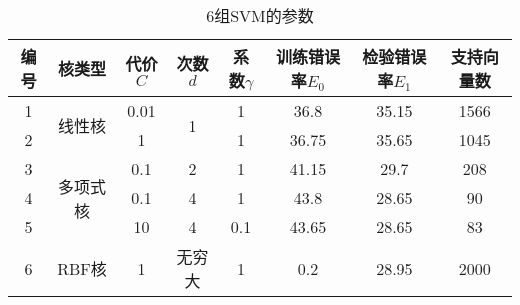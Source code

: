 {\small 
\begin{table}[htbp]
  \centering
  \caption{6组SVM的参数}
    \begin{tabular}{cccccccc}
    \hline
    {编号} & {核类型} & {代价$C$} & {次数$d$} & {系数$\gamma$} & {训练错误率$E_0$} & {检验错误率$E_1$} & {支持向量数} \\
    \hline
    1     & \multirow{2}[1]{*}{线性核} & 0.01  & \multirow{2}[1]{*}{1} & 1     & 36.8  & 35.15 & 1566 \\
    2     &       & 1     &       & 1     & 36.75 & 35.65 & 1045 \\
    3     & \multirow{3}[0]{*}{多项式核} & 0.1   & 2     & 1     & 41.15 & 29.7  & 208 \\
    4     &       & 0.1   & 4     & 1     & 43.8  & 28.65 & 90 \\
    5     &       & 10    & 4     & 0.1   & 43.65 & 28.65 & 83 \\
    6     & RBF核  & 1     & 无穷大   & 1     & 0.2   & 28.95 & 2000 \\
   \hline
    \end{tabular}%
  \label{tab:addlabel}%
\end{table}%
}

